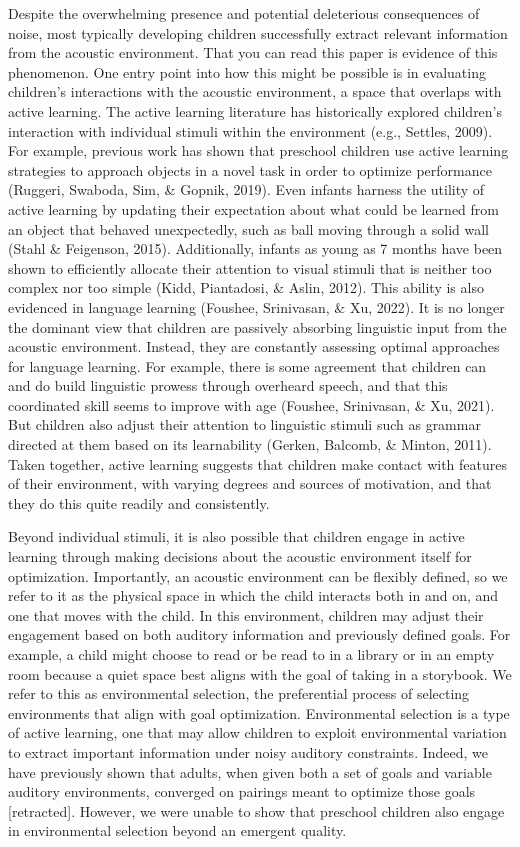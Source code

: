 \documentclass[10pt, letterpaper]{article}
\begin{document}
Despite the overwhelming presence and potential deleterious consequences
of noise, most typically developing children successfully extract
relevant information from the acoustic environment. That you can read
this paper is evidence of this phenomenon. One entry point into how this
might be possible is in evaluating children's interactions with the
acoustic environment, a space that overlaps with active learning. The
active learning literature has historically explored children's
interaction with individual stimuli within the environment (e.g.,
Settles, 2009). For example, previous work has shown that preschool
children use active learning strategies to approach objects in a novel
task in order to optimize performance (Ruggeri, Swaboda, Sim, \& Gopnik,
2019). Even infants harness the utility of active learning by updating
their expectation about what could be learned from an object that
behaved unexpectedly, such as ball moving through a solid wall (Stahl \&
Feigenson, 2015). Additionally, infants as young as 7 months have been
shown to efficiently allocate their attention to visual stimuli that is
neither too complex nor too simple (Kidd, Piantadosi, \& Aslin, 2012).
This ability is also evidenced in language learning (Foushee,
Srinivasan, \& Xu, 2022). It is no longer the dominant view that
children are passively absorbing linguistic input from the acoustic
environment. Instead, they are constantly assessing optimal approaches
for language learning. For example, there is some agreement that
children can and do build linguistic prowess through overheard speech,
and that this coordinated skill seems to improve with age (Foushee,
Srinivasan, \& Xu, 2021). But children also adjust their attention to
linguistic stimuli such as grammar directed at them based on its
learnability (Gerken, Balcomb, \& Minton, 2011). Taken together, active
learning suggests that children make contact with features of their
environment, with varying degrees and sources of motivation, and that
they do this quite readily and consistently.

Beyond individual stimuli, it is also possible that children engage in
active learning through making decisions about the acoustic environment
itself for optimization. Importantly, an acoustic environment can be
flexibly defined, so we refer to it as the physical space in which the
child interacts both in and on, and one that moves with the child. In
this environment, children may adjust their engagement based on both
auditory information and previously defined goals. For example, a child
might choose to read or be read to in a library or in an empty room
because a quiet space best aligns with the goal of taking in a
storybook. We refer to this as environmental selection, the preferential
process of selecting environments that align with goal optimization.
Environmental selection is a type of active learning, one that may allow
children to exploit environmental variation to extract important
information under noisy auditory constraints. Indeed, we have previously
shown that adults, when given both a set of goals and variable auditory
environments, converged on pairings meant to optimize those goals
{[}retracted{]}. However, we were unable to show that preschool children
also engage in environmental selection beyond an emergent quality.
\end{document}
